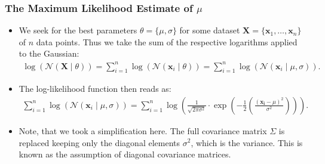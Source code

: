 \begin{frame}
  \frametitle{The Maximum Likelihood Estimate of $\mu$}
  \begin{itemize}
  \item We seek for the best parameters $\theta = \{\mu, \sigma\}$ for some dataset $\mathbf{X} = \{\mathbf{x}_1,\ldots,\mathbf{x}_n\}$ of $n$ data points. Thus we take the sum of the respective logarithms applied to the Gaussian:
    \begin{align}
      \log\left(\mathcal{N}(\mathbf{X} \; \vert \; \theta)\right) = \sum_{i=1}^{n} \log\left( \mathcal{N}(\mathbf{x}_i \; \vert \; \theta)\right) = \sum_{i=1}^{n} \log\left( \mathcal{N}(\mathbf{x}_i \; \vert \; \mu, \sigma)\right).
    \end{align}
  \item The log-likelihood function then reads as:
    \begin{align}
      \sum_{i=1}^{n} \log\left(\mathcal{N}(\mathbf{x}_i \; \vert \; \mu, \sigma)\right) = \sum_{i=1}^{n} \log\left(\frac{1}{\sqrt{2\pi\sigma^2}} \cdot \exp \left( -\frac{1}{2} \left( \frac{(\mathbf{x_i}-\mu)^2}{\sigma^2} \right) \right)\right).
    \end{align}
  \item Note, that we took a simplification here. The full covariance matrix $\Sigma$ is replaced keeping only the diagonal elements $\sigma^2$, which is the variance. This is known as the assumption of diagonal covariance matrices.
  \end{itemize}
\end{frame}


